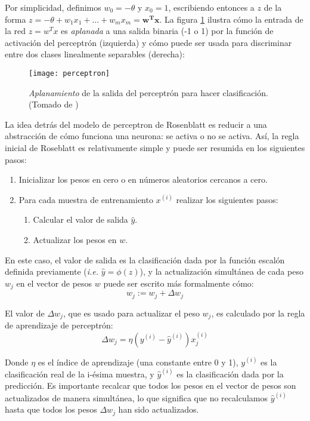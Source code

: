 Por simplicidad, definimos $w_0=-\theta$ y $x_0=1$, escribiendo
entonces a $z$ de la forma $z=-\theta + w_1x_1 + \dots + w_mx_m =
\mathbf{w^Tx}$.  La figura \ref{fig:binary} ilustra cómo la entrada de
la red $z=w^Tx$ es \textit{aplanada} a una salida binaria (-1 o 1) por
la función de activación del perceptrón (izquierda) y cómo puede ser
usada para discriminar entre dos clases linealmente separables
(derecha):
\begin{figure}[H]
  \texttt{[image: perceptron]} \centering
  \caption{\textit{Aplanamiento} de la salida del perceptrón para
    hacer clasificación.  (Tomado de \cite{python})}
  \label{fig:binary}
\end{figure}

La idea detrás del modelo de perceptron de Rosenblatt es reducir a una
abstracción de cómo funciona una neurona: se activa o no se
activa. Así, la regla inicial de Roseblatt es relativamente simple y
puede ser resumida en los siguientes pasos:
\begin{enumerate}
  \item Inicializar los pesos en cero o en números aleatorios cercanos
    a cero.
  \item Para cada muestra de entrenamiento $x^{(i)}$ realizar los
    siguientes pasos:
  \begin{enumerate}
    \item Calcular el valor de salida $\hat y$.
    \item Actualizar los pesos en $w$.
  \end{enumerate}
\end{enumerate}


En este caso, el valor de salida es la clasificación dada por la
función escalón definida previamente (\textit{i.e.} $\hat y
= \phi(z)$), y la actualización simultánea de cada peso $w_j$ en el
vector de pesos $w$ puede ser escrito más formalmente cómo:
\begin{equation}
  w_j := w_j + \Delta w_j
\end{equation}

El valor de $\Delta w_j$, que es usado para actualizar el peso $w_j$,
es calculado por la regla de aprendizaje de perceptrón:
\begin{equation}
  \Delta w_j = \eta (y^{(i)} - \hat y^{(i)})x^{(i)}_j
\end{equation}

Donde $\eta$ es el índice de aprendizaje (una constante entre 0 y 1),
$y^{(i)}$ es la clasificación real de la i-ésima muestra, y $\hat
y^{(i)}$ es la clasificación dada por la predicción. Es importante
recalcar que todos los pesos en el vector de pesos son actualizados de
manera simultánea, lo que significa que no recalculamos $\hat y^{(i)}$
hasta que todos los pesos $\Delta w_j$ han sido actualizados.

